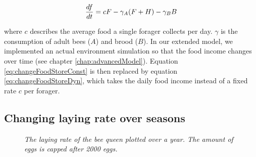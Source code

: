 	\begin{equation}\label{eq:changeFoodStoreConst}
		{df \over dt} = c F - \gamma_A (F+H) - \gamma_B B
	\end{equation}
         
	where $c$ describes the average food a single forager collects per day. $\gamma$ is the consumption of adult bees ($A$) and brood ($B$). In our extended model, we implemented an actual environment simulation so that the food income changes over time (see chapter \ref{chap:advancedModel}). Equation \ref{eq:changeFoodStoreConst} is then replaced by equation \ref{eq:changeFoodStoreDyn}, which takes the daily food income instead of a fixed rate $c$ per forager.

	\subsection{Changing laying rate over seasons}
		\begin{figure}
			\centering
			\caption{\textit{The laying rate of the bee queen plotted over a year. The amount of eggs is capped after 2000 eggs. }}
			\label{fig:dynLayingRate}
		\end{figure}
		
